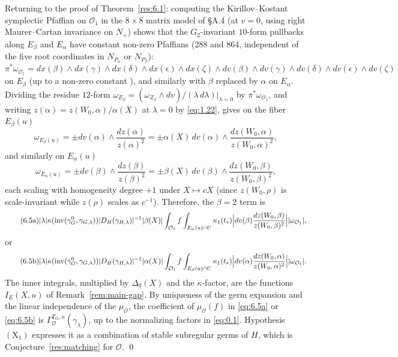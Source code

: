 \documentclass[12pt,letterpaper]{amsart}
\theoremstyle{plain}
\theoremstyle{definition}
\theoremstyle{remark}
\theoremstyle{definition}
\DeclareMathOperator{\inv}{inv}
\begin{document}
Returning to the proof of Theorem~\ref{res:6.1}:
computing the Kirillov--Kostant symplectic Pfaffian on ${\mathcal O}_1$ in the
$8\times 8$ matrix model of \S A.4 (at $v=0$, using right Maurer--Cartan
invariance on $N_+$) shows that the $G_2$-invariant $10$-form pullbacks along
$E_\beta$ and $E_\alpha$ have constant non-zero Pfaffians ($288$ and $864$,
independent of the five root coordinates in $N_{P_\alpha}$ or $N_{P_\beta}$):
\[
\pi^*\omega_{{\mathcal O}_1}=
dx(\beta)\wedge dx(\gamma)\wedge dx(\delta)\wedge dx(\epsilon)\wedge dx(\zeta)
\wedge dv(\beta)\wedge dv(\gamma)\wedge dv(\delta)\wedge dv(\epsilon)\wedge dv(\zeta)
\]
on $E_\beta$ (up to a non-zero constant \cite{Ra72}), and similarly with
$\beta$ replaced by $\alpha$ on $E_\alpha$. Dividing the residue $12$-form
$\omega_{E_\beta}=(\omega_{Z_\beta}\wedge dv)/(\lambda\,d\lambda)|_{\lambda=0}$
by $\pi^*\omega_{{\mathcal O}_1}$, and writing $z(\alpha)=z(W_0,\alpha)/\alpha(X)$
at $\lambda=0$ by \eqref{eq:1.22}, gives on the fiber $E_\beta(u)$
\[
\omega_{E_\beta(u)}=
\pm dv(\alpha)\wedge\frac{dz(\alpha)}{z(\alpha)^2}
=\pm\alpha(X)\,dv(\alpha)\wedge\frac{dz(W_0,\alpha)}{z(W_0,\alpha)^2},
\]
and similarly on $E_\alpha(u)$
\[
\omega_{E_\alpha(u)}
=\pm dv(\beta)\wedge\frac{dz(\beta)}{z(\beta)^2}
=\pm\beta(X)\,dv(\beta)\wedge\frac{dz(W_0,\beta)}{z(W_0,\beta)^2},
\]
each scaling with homogeneity degree $+1$ under $X\mapsto cX$ (since
$z(W_0,\rho)$ is scale-invariant while $z(\rho)$ scales as $c^{-1}$).
Therefore, the $\beta =2$ term is
\begin{equation}\tag{6.5a}\label{eq:6.5a}
|\lambda|\kappa(\inv(\gamma_G^0,\gamma_{G,\lambda}))
|D_H(\gamma_{H,\lambda})|^{-1}
|\beta(X)|\int_{{\mathcal O}_1}f\int_{E_\alpha(u)\cap U}
\kappa_1(t_*)\Bigl|dv(\beta)
\frac{dz(W_0,\beta)}{z(W_0,\beta)^2}\Bigr||\omega_{{\mathcal O}_1}|,
\end{equation}
or
\begin{equation}\tag{6.5b}\label{eq:6.5b}
|\lambda|\kappa(\inv(\gamma_G^0,\gamma_{G,\lambda}))
|D_H(\gamma_{H,\lambda})|^{-1}
|\alpha(X)|\int_{{\mathcal O}_1}f\int_{E_\beta(u)\cap U}
\kappa_1(t_*)\Bigl|dv(\alpha)
\frac{dz(W_0,\alpha)}{z(W_0,\alpha)^2}\Bigr||\omega_{{\mathcal O}_1}|.
\end{equation}
The inner integrals, multiplied by $\Delta_0(X)$ and the
$\kappa$-factor, are the functions $I_E(X,u)$ of Remark~\ref{rem:main-gap}.
By uniqueness of the germ expansion and the linear independence of the
$\mu_{\mathcal O}$, the coefficient of $\mu_{\mathcal O}(f)$ in
\eqref{eq:6.5a} or \eqref{eq:6.5b} is
$\Gamma^{T_G,\kappa}_{\mathcal O}(\gamma_\lambda)$, up to the normalizing
factors in \eqref{eq:0.1}. Hypothesis $(\mathrm X_1)$ expresses it as a
combination of stable subregular germs of $H$, which is
Conjecture~\ref{res:matching} for $\mathcal O$. \qed
\end{document}
